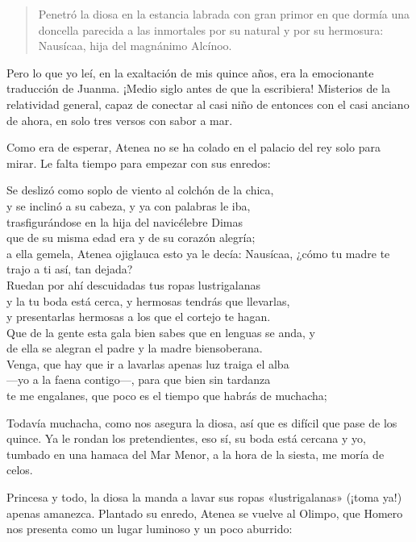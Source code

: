 \begin{quote}
Penetró la diosa en la estancia labrada con gran primor en que dormía una doncella parecida a las inmortales por su natural y por su hermosura: Nausícaa, hija del magnánimo Alcínoo.
\end{quote}

Pero lo que yo leí, en la exaltación de mis quince años, era la emocionante traducción de Juanma. ¡Medio siglo antes de que la escribiera! Misterios de la relatividad general, capaz de conectar al casi niño de entonces con el casi anciano de ahora, en solo tres versos con sabor a mar.

Como era de esperar, Atenea no se ha colado en el palacio del rey solo para mirar. Le falta tiempo para empezar con sus enredos:

\begin{versocita}
Se deslizó como soplo de viento al colchón de la chica,\\
y se inclinó a su cabeza, y ya con palabras le iba,\\
trasfigurándose en la hija del navicélebre Dimas\\
que de su misma edad era y de su corazón alegría;\\
a ella gemela, Atenea ojiglauca esto ya le decía:
\stanzabreak
Nausícaa, ¿cómo tu madre te trajo a ti así, tan dejada?\\
Ruedan por ahí descuidadas tus ropas lustrigalanas\\
y la tu boda está cerca, y hermosas tendrás que llevarlas,\\
y presentarlas hermosas a los que el cortejo te hagan.\\
Que de la gente esta gala bien sabes que en lenguas se anda, y\\
de ella se alegran el padre y la madre biensoberana.\\
Venga, que hay que ir a lavarlas apenas luz traiga el alba\\
---yo a la faena contigo---, para que bien sin tardanza\\
te me engalanes, que poco es el tiempo que habrás de muchacha;
\end{versocita}

Todavía muchacha, como nos asegura la diosa, así que es difícil que pase de los quince. Ya le rondan los pretendientes, eso sí, su boda está cercana y yo, tumbado en una hamaca del Mar Menor, a la hora de la siesta, me moría de celos.

Princesa y todo, la diosa la manda a lavar sus ropas «lustrigalanas» (¡toma ya!) apenas amanezca. Plantado su enredo, Atenea se vuelve al Olimpo, que Homero nos presenta como un lugar luminoso y un poco aburrido:

